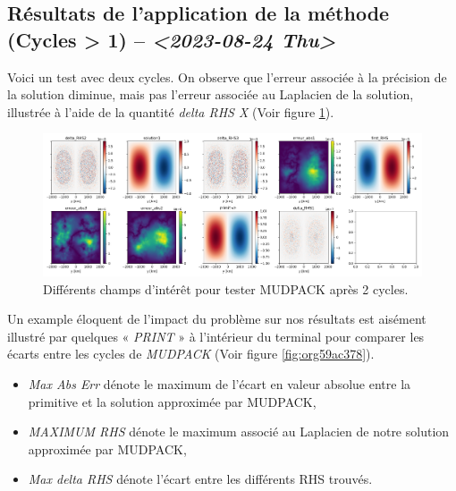 \documentclass[10pt]{article}
\numberwithin{equation}{section}
\begin{document}
\subsection{Résultats de l'application de la méthode (Cycles > 1) -- \textit{<2023-08-24 Thu>}}
\label{sec:orge4143a5}
Voici un test avec deux cycles.
On observe que l'erreur associée à la précision de la solution diminue, mais pas l'erreur associée au Laplacien de la solution, illustrée à l'aide de la quantité \emph{delta RHS X} (Voir figure \ref{fig:org7a32230}).

\begin{figure}[htbp]
\centering
\includegraphics[width=.9\linewidth]{figures/MUDPACK/2023-08-23_MUDPACK_test_dirichlet3.png}
\caption{\label{fig:org7a32230}Différents champs d'intérêt pour tester MUDPACK après 2 cycles.}
\end{figure}

Un example éloquent de l'impact du problème sur nos résultats est aisément illustré par quelques « \emph{PRINT} » à l'intérieur du terminal pour comparer les écarts entre les cycles de \emph{MUDPACK} (Voir figure \ref{fig:org59ac378}).
\begin{itemize}
\item \emph{Max Abs Err} dénote le maximum de l'écart en valeur absolue entre la primitive et la solution approximée par MUDPACK,
\item \emph{MAXIMUM RHS} dénote le maximum associé au Laplacien de notre solution approximée par MUDPACK,
\item \emph{Max delta RHS} dénote l'écart entre les différents RHS trouvés.
\end{itemize}
\end{document}
